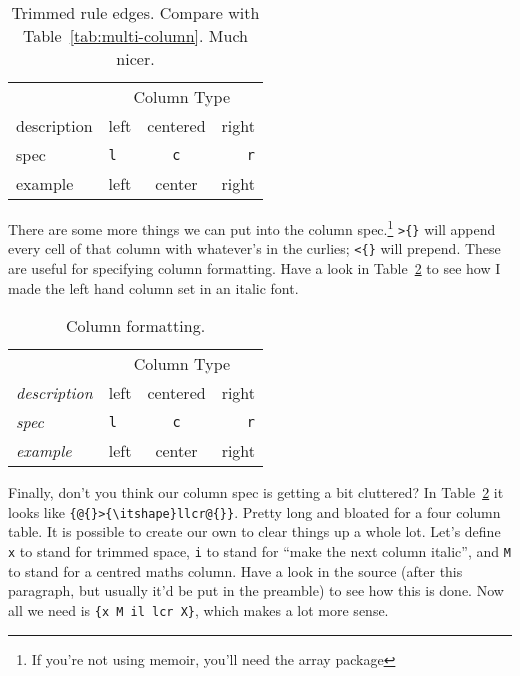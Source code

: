 \documentclass[article,oneside]{memoir}
\begin{document}
\begin{table}[htbp]
  \centering
  \begin{tabular}{@{}llcr@{}} %
    \toprule
    & \multicolumn{3}{c}{Column Type}\\
    \cmidrule(l){2-4} %
    description & left & centered & right\\
    spec & \texttt{l} & \texttt{c} & \texttt{r} \\
    example & left & center & right \\
    \bottomrule
  \end{tabular}
  \caption{Trimmed rule edges. Compare with Table~\ref{tab:multi-column}. Much nicer.}
  \label{tab:trim}
\end{table}

There are some more things we can put into the column spec.\footnote{If you're not using \textsf{memoir}, you'll need the \textsf{array} package} \verb|>{}| will append every cell of that column with whatever's in the curlies; \verb|<{}| will prepend. These are useful for specifying column formatting. Have a look in Table~\ref{tab:col-format} to see how I made the left hand column set in an italic font.

\begin{table}[htbp]
  \centering
  \begin{tabular}{@{}>{\itshape}llcr@{}} %
    \toprule
    & \multicolumn{3}{c}{Column Type}\\
    \cmidrule(l){2-4} %
    description & left & centered & right\\
    spec & \texttt{l} & \texttt{c} & \texttt{r} \\
    example & left & center & right \\
    \bottomrule
  \end{tabular}
  \caption{Column formatting.}
  \label{tab:col-format}
\end{table}

Finally, don't you think our column spec is getting a bit cluttered? In Table~\ref{tab:col-format} it looks like \verb|{@{}>{\itshape}llcr@{}}|. Pretty long and bloated for a four column table. It is possible to create our own to clear things up a whole lot. Let's define \verb|x| to stand for trimmed space, \verb|i| to stand for ``make the next column italic'', and \verb|M| to stand for a centred maths column. Have a look in the source (after this paragraph, but usually it'd be put in the preamble) to see how this is done. Now all we need is \verb|{x M il lcr X}|, which makes a lot more sense.
\end{document}
